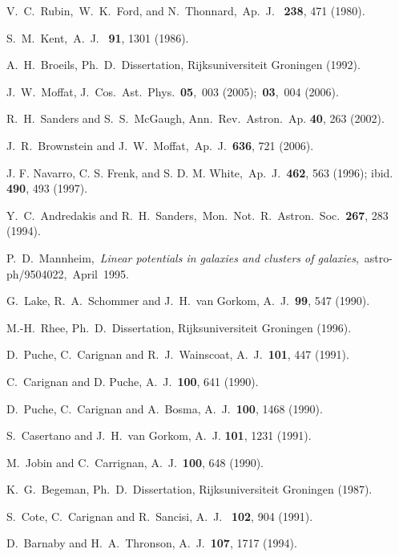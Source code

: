 \begin{thebibliography}{10}
 V.~C.~Rubin,~W.~K.~Ford, and N.~Thonnard,~Ap.~J.~ {\bf 238},  471 (1980).

 S.~M.~Kent,~A.~J.~ {\bf 91}, 1301 (1986).

 A.~H.~Broeils,  Ph.~D.~Dissertation, Rijksuniversiteit Groningen (1992).




 J.~W.~Moffat, J.~Cos.~Ast.~Phys.~{\bf 05},~003 (2005);~{\bf 03},~004 (2006).

 R.~H.~Sanders and S.~S.~McGaugh, Ann.~Rev.~Astron.~Ap. {\bf 40}, 263 (2002).


 J.~R.~Brownstein and  J.~W.~Moffat,~Ap.~J.~{\bf 636}, 721 (2006).

 J. F. Navarro, C. S. Frenk, and S. D. M. White,~Ap.~J.~{\bf 462}, 563 (1996); ibid. {\bf 490}, 493 (1997).


 Y.~C.~Andredakis and R.~H.~Sanders,~Mon.~Not.~R.~Astron.~Soc.~{\bf 267}, 283 (1994).

 P.~D.~Mannheim,~{\it Linear potentials in galaxies and clusters of galaxies},~astro-ph/9504022,~April~1995.

 G.~Lake, R.~A.~Schommer and J.~H.~van Gorkom, A.~J.~{\bf 99}, 547 (1990).

 M.-H.~Rhee, Ph.~D.~Dissertation, Rijksuniversiteit Groningen (1996).

 D.~Puche, C.~Carignan and R.~J.~Wainscoat,  A.~J.~{\bf 101},
447 (1991).

 C.~Carignan and D. Puche, A.~J.~{\bf 100}, 641 (1990).

 D.~Puche, C.~Carignan and A.~Bosma,  A.~J.~{\bf 100}, 1468 (1990).



 S.~Casertano and J.~H.~van Gorkom,  A.~J. {\bf 101}, 1231 (1991).

 M.~Jobin and C.~Carrignan, A.~J.~{\bf 100}, 648 (1990).


 K.~G.~Begeman, Ph.~D.~Dissertation, Rijksuniversiteit Groningen (1987).

 S.~Cote, C.~Carignan and R.~Sancisi, A.~J.~ {\bf 102}, 904 (1991).

 D.~Barnaby and H.~A.~Thronson, A.~J.~{\bf 107}, 1717 (1994).


\end{thebibliography}
